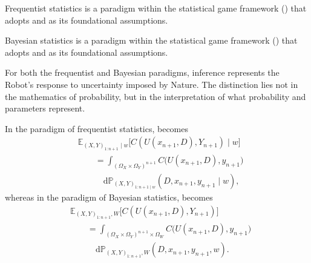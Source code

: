 \begin{definition}
	\label{def:frequentist_statistics}
	Frequentist statistics is a paradigm within the statistical game framework () that adopts  and  as its foundational assumptions.
\end{definition}

\begin{definition}
	\label{def:bayesian_statistics}
	Bayesian statistics is a paradigm within the statistical game framework () that adopts  and  as its foundational assumptions.
\end{definition}

\begin{remark}[Inference]
	For both the frequentist and Bayesian paradigms, inference represents the Robot's response to uncertainty imposed by Nature. 
	The distinction lies not in the mathematics of probability, but in the interpretation of what probability and parameters represent.
\end{remark}

\begin{remark}
	\label{rem:frequentist_bayesian_expected_cost}
	In the paradigm of frequentist statistics,  becomes
	\begin{equation}
		\begin{split}
			&\mathbb{E}_{(X,Y)_{1\colon n+1}\mid w}\big[C(U(x_{n+1},D),Y_{n+1})\mid w\big] \\
			&\qquad= \int_{(\Omega_X\times\Omega_Y)^{n+1}}
			C\big(U(x_{n+1},D),y_{n+1}\big)\\
			&\qquad\quad \mathrm{d}\mathbb{P}_{(X,Y)_{1\colon n+1\mid w}}(D,x_{n+1},y_{n+1}\mid w),
		\end{split}
		\label{eq:expcost5}
	\end{equation}
 	whereas in the paradigm of Bayesian statistics,  becomes
 	\begin{equation}
 		\begin{split}
 			&\mathbb{E}_{(X,Y)_{1\colon n+1},W}\big[C(U(x_{n+1},D),Y_{n+1})\big] \\
 			&\qquad= \int_{(\Omega_X\times\Omega_Y)^{n+1}\times\Omega_W}
 			C\big(U(x_{n+1},D),y_{n+1}\big)\\
 			&\qquad\quad
 			\mathrm{d}\mathbb{P}_{(X,Y)_{1\colon n+1},W }(D,x_{n+1},y_{n+1},w).
 		\end{split}
 		\label{eq:expcost6}
 	\end{equation}
\end{remark}



